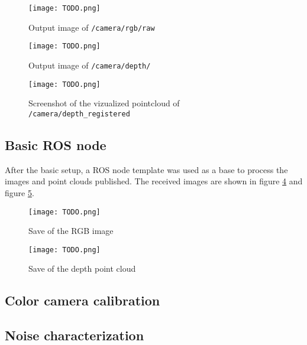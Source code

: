 \documentclass[DIV12,a4paper]{scrartcl}
\begin{document}
\begin{figure}
  \centering
  \texttt{[image: TODO.png]}
  \label{fig:rgb-raw}
  \caption{Output image of \texttt{/camera/rgb/raw}}
\end{figure}

\begin{figure}[!htbp]
  \centering
  \texttt{[image: TODO.png]}
  \caption{Output image of \texttt{/camera/depth/}}
  \label{fig:depth}
\end{figure}

\begin{figure}[!htbp]
  \centering
  \texttt{[image: TODO.png]}
  \caption{Screenshot of the vizualized pointcloud of \texttt{/camera/depth\_registered}}
  \label{fig:depth_registered}
\end{figure}

\subsection{Basic ROS node}
\label{sec:basic-ros}
After the basic setup, a ROS node template was used as a base to process the images and point clouds published. The received images are shown in figure \ref{fig:rgb-save} and figure \ref{fig:depth-save}.

\begin{figure}[!htbp]
  \centering
  \texttt{[image: TODO.png]}
  \caption{Save of the RGB image}
  \label{fig:rgb-save}
\end{figure}

\begin{figure}[!htbp]
  \centering
  \texttt{[image: TODO.png]}
  \caption{Save of the depth point cloud}
  \label{fig:depth-save}
\end{figure}

\subsection{Color camera calibration}
\label{sec:calibration}

\subsection{Noise characterization}
\label{sec:noise_characterization}
\end{document}

